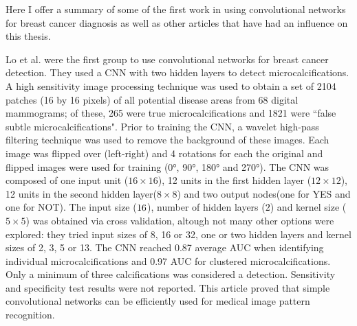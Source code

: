 Here I offer a summary of some of the first work in using convolutional networks for breast cancer diagnosis as well as other articles that have had an influence on this thesis.

Lo et al.\cite{Lo1995} were the first group to use convolutional networks for breast cancer detection. They used a CNN with two hidden layers to detect microcalcifications. A high sensitivity image processing technique was used to obtain a set of 2104 patches (16 by 16 pixels) of all potential disease areas from 68 digital mammograms; of these, 265 were true microcalcifications and 1821 were ``false subtle microcalcifications". Prior to training the CNN, a wavelet high-pass filtering technique was used to remove the background of these images. Each image was flipped over (left-right) and 4 rotations for each the original and flipped images were used for training (0°, 90°, 180° and 270°). The CNN was composed of one input unit ($16\times16$), 12 units in the first hidden layer ($12\times12$), 12 units in the second hidden layer($8\times 8$) and two output nodes(one for YES and one for NOT). The input size ($16\time16$), number of hidden layers ($2$) and kernel size ($5\times5$) was obtained via cross validation, altough not many other options were explored: they tried input sizes of 8, 16 or 32, one or two hidden layers and kernel sizes of 2, 3, 5 or 13. The CNN reached 0.87 average AUC when identifying individual microcalcifications and 0.97 AUC for clustered microcalcifications. Only a minimum of three calcifications was considered a detection. Sensitivity and specificity test results were not reported. This article proved that simple convolutional networks can be efficiently used for medical image pattern recognition.


